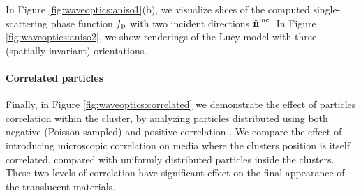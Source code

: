 In Figure \ref{fig:waveoptics:aniso1}(b), we visualize slices of the computed single-scattering phase function $f_\mathrm{p}$ with two incident directions ${\hat{\mathbf{n}}}^\mathrm{inc}$.
In Figure \ref{fig:waveoptics:aniso2}, we show renderings of the Lucy model with three (spatially invariant) orientations.




\paragraph{Correlated particles}

Finally, in Figure \ref{fig:waveoptics:correlated} we demonstrate the effect of particles correlation within the cluster, by analyzing particles distributed using both negative (Poisson sampled) and positive correlation \cite{jarabo2018radiative}. We compare the effect of introducing microscopic correlation on media where the clusters position is itself correlated, compared with uniformly distributed particles inside the clusters. These two levels of correlation have significant effect on the final appearance of the translucent materials. 


